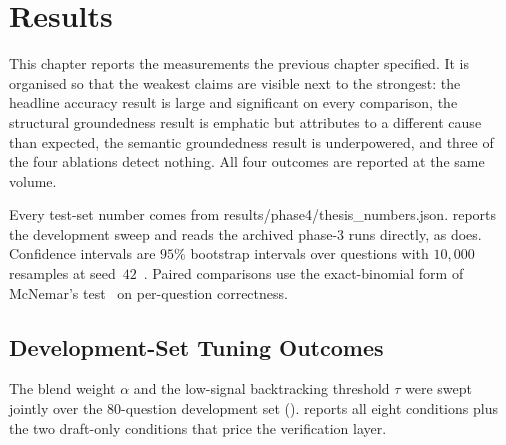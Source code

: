 \chapter{Results}\label{ch:results}

This chapter reports the measurements the previous chapter specified. It is
organised so that the weakest claims are visible next to the strongest: the
headline accuracy result is large and significant on every comparison, the
structural groundedness result is emphatic but attributes to a different cause
than expected, the semantic groundedness result is underpowered, and three of
the four ablations detect nothing. All four outcomes are reported at the same
volume.

Every test-set number comes from \textsf{results/phase4/thesis\_numbers.json}.
 reports the development sweep and reads the archived
phase-3 runs directly, as  does. Confidence intervals are
$95\%$ bootstrap intervals over questions with $10{,}000$ resamples at
seed~$42$~\cite{efron1979bootstrap}. Paired comparisons use the exact-binomial
form of McNemar's test~\cite{mcnemar1947note} on per-question correctness.

\section{Development-Set Tuning Outcomes}\label{sec:dev-tuning}

The blend weight $\alpha$ and the low-signal backtracking threshold $\tau$ were
swept jointly over the $80$-question development set ().
 reports all eight conditions plus the two draft-only conditions
that price the verification layer.


